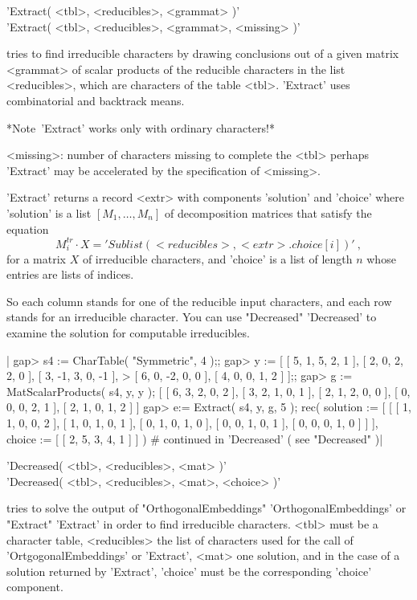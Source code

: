 'Extract( <tbl>, <reducibles>, <grammat> )'\\
'Extract( <tbl>, <reducibles>, <grammat>, <missing> )'

tries  to  find irreducible  characters by  drawing  conclusions out of a
given matrix <grammat> of scalar  products of the reducible characters in
the  list    <reducibles>,  which  are characters of     the table <tbl>.
'Extract' uses combinatorial and backtrack means.

*Note\:\ 'Extract' works only with ordinary characters!*

<missing>: number of characters missing to complete the <tbl>
           perhaps 'Extract' may be accelerated by the specification of
           <missing>.

'Extract' returns a record <extr> with components 'solution' and 'choice'
where 'solution' is   a  list $[  M_1, \ldots,  M_n  ]$ of  decomposition
matrices  that  satisfy the  equation \[   M_i^{tr} \cdot X   = 'Sublist(
<reducibles>, <extr>.choice[i] )'\  , \] for a  matrix $X$ of irreducible
characters, and 'choice' is a list of length  $n$ whose entries are lists
of indices.

So each column stands for one of the reducible input characters, and each
row stands  for an   irreducible   character.  You can use    "Decreased"
'Decreased' to examine the solution for computable irreducibles.

|    gap> s4 := CharTable( "Symmetric", 4 );;
    gap> y := [ [ 5, 1, 5, 2, 1 ], [ 2, 0, 2, 2, 0 ], [ 3, -1, 3, 0, -1 ],
    >  [ 6, 0, -2, 0, 0 ], [ 4, 0, 0, 1, 2 ] ];;
    gap> g := MatScalarProducts( s4, y, y );
    [ [ 6, 3, 2, 0, 2 ], [ 3, 2, 1, 0, 1 ], [ 2, 1, 2, 0, 0 ],
      [ 0, 0, 0, 2, 1 ], [ 2, 1, 0, 1, 2 ] ]
    gap> e:= Extract( s4, y, g, 5 );
    rec(
      solution :=
       [ [ [ 1, 1, 0, 0, 2 ], [ 1, 0, 1, 0, 1 ], [ 0, 1, 0, 1, 0 ],
              [ 0, 0, 1, 0, 1 ], [ 0, 0, 0, 1, 0 ] ] ],
      choice := [ [ 2, 5, 3, 4, 1 ] ] )
    # continued in 'Decreased' ( see "Decreased" )|


'Decreased( <tbl>, <reducibles>, <mat> )'\\
'Decreased( <tbl>, <reducibles>, <mat>, <choice> )'

tries     to      solve   the    output      of    "OrthogonalEmbeddings"
'OrthogonalEmbeddings'  or    "Extract"   'Extract' in   order   to  find
irreducible characters.  <tbl> must  be  a character table,  <reducibles>
the  list of characters used  for  the call of 'OrtgogonalEmbeddings'  or
'Extract', <mat> one solution, and in the  case of a solution returned by
'Extract', 'choice' must be the corresponding 'choice' component.

